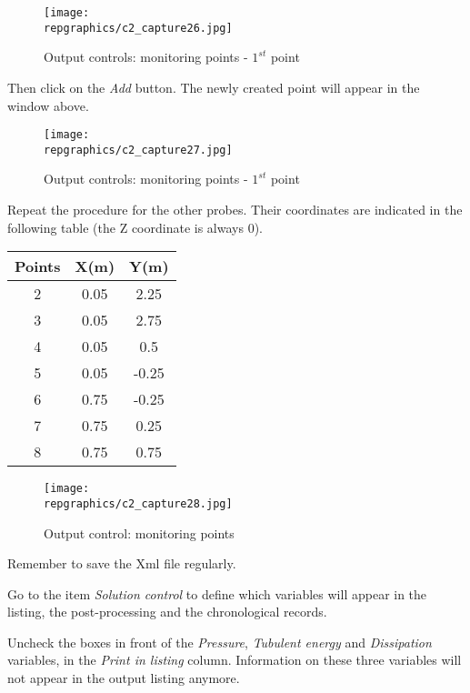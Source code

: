 \begin{figure}[h!]
\begin{center}
\texttt{[image: \\repgraphics/c2\_capture26.jpg]} 
\caption{Output controls: monitoring points - $1^{st}$ point}
\label{fig26_e2}
\end{center}
\end{figure}


\newpage
Then click on the {\itshape Add} button. The newly created point will appear in
the window above.

\begin{figure}[h!]
\begin{center}
\texttt{[image: \\repgraphics/c2\_capture27.jpg]} 
\caption{Output controls: monitoring points - $1^{st}$ point}
\label{fig27_e2}
\end{center}
\end{figure}


\newpage
Repeat the procedure for the other probes. Their coordinates are indicated in
the following table (the Z coordinate is always 0).
\begin{center}
\begin{tabular}{|c|c|c|}
\hline
Points & X(m) & Y(m) \\
\hline
2 & 0.05 & 2.25 \\
\hline
3 & 0.05 & 2.75 \\
\hline
4 & 0.05 & 0.5 \\
\hline
5 & 0.05 & -0.25 \\
\hline
6 & 0.75 & -0.25 \\
\hline
7 & 0.75 & 0.25 \\
\hline
8 & 0.75 & 0.75 \\
\hline
\end{tabular}
\end{center}

\begin{figure}[h!]
\begin{center}
\texttt{[image: \\repgraphics/c2\_capture28.jpg]} 
\caption{Output control: monitoring points}
\label{fig28_e2}
\end{center}
\end{figure}

Remember to save the Xml file regularly.


\newpage
Go to the item {\itshape Solution control} to define which variables will
appear in the listing, the post-processing and the chronological records.

Uncheck the boxes in front of the {\itshape Pressure}, {\itshape Tubulent energy}
and {\itshape Dissipation} variables, in the {\itshape  Print in listing}
column. Information on these three variables will not appear in the output
listing anymore.

